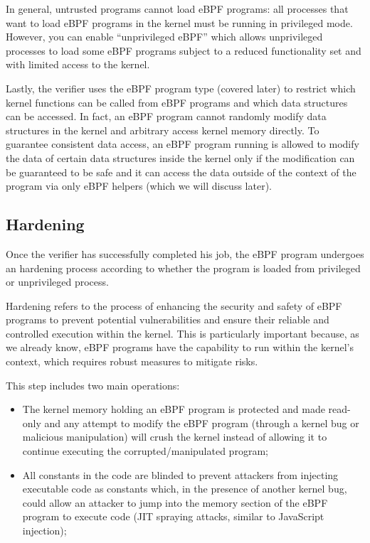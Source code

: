 In general, untrusted programs cannot load eBPF programs: all processes that want to load eBPF programs in the kernel must be running in privileged mode.
However, you can enable ``unprivileged eBPF'' which allows unprivileged processes to load some eBPF programs subject to a reduced functionality set and with limited access to the kernel.

Lastly, the verifier uses the eBPF program type (covered later) to restrict which kernel functions can be called from eBPF programs and which data structures can be accessed. 
In fact, an eBPF program cannot randomly modify data structures in the kernel and arbitrary access kernel memory directly.
To guarantee consistent data access, an eBPF program running is allowed to modify the data of certain data structures inside the kernel only if the modification can be guaranteed to be safe and it can access the data outside of the context of the program via only eBPF helpers (which we will discuss later).

\subsection{Hardening}

Once the verifier has successfully completed his job, the eBPF program undergoes an hardening process according to whether the program is loaded from privileged or unprivileged process.

Hardening refers to the process of enhancing the security and safety of eBPF programs to prevent potential vulnerabilities and ensure their reliable and controlled execution within the kernel. 
This is particularly important because, as we already know, eBPF programs have the capability to run within the kernel's context, which requires robust measures to mitigate risks.

This step includes two main operations:

\begin{itemize}
	\item The kernel memory holding an eBPF program is protected and made read-only
		and any attempt to modify the eBPF program (through a kernel bug or malicious manipulation) will crush the kernel instead of allowing it to continue executing the corrupted/manipulated program;
	\item All constants in the code are blinded to prevent attackers from injecting
		executable code as constants which, in the presence of another kernel bug, could allow an attacker to jump into the memory section of the eBPF program to execute code (JIT spraying attacks, similar to JavaScript injection);
\end{itemize}

